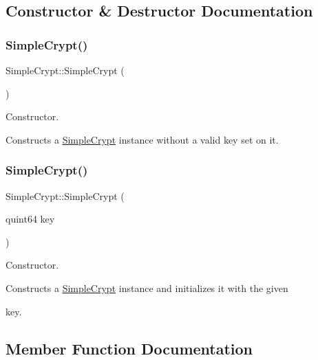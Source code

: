 \subsection{Constructor \& Destructor Documentation}
\mbox{\label{classSimpleCrypt_ac474d12cfa9f93bfecea35891831046d}} 
\subsubsection{\texorpdfstring{Simple\+Crypt()}{SimpleCrypt()}\hspace{0.1cm}{\footnotesize\ttfamily [1/2]}}
{\footnotesize\ttfamily Simple\+Crypt\+::\+Simple\+Crypt (\begin{DoxyParamCaption}{ }\end{DoxyParamCaption})}

Constructor.

Constructs a \hyperlink{classSimpleCrypt}{Simple\+Crypt} instance without a valid key set on it. \mbox{\label{classSimpleCrypt_a65942757b85b3dd36618ea3edc5ceb89}} 
\subsubsection{\texorpdfstring{Simple\+Crypt()}{SimpleCrypt()}\hspace{0.1cm}{\footnotesize\ttfamily [2/2]}}
{\footnotesize\ttfamily Simple\+Crypt\+::\+Simple\+Crypt (\begin{DoxyParamCaption}\item[{quint64}]{key }\end{DoxyParamCaption})\hspace{0.3cm}{\ttfamily [explicit]}}

Constructor.

Constructs a \hyperlink{classSimpleCrypt}{Simple\+Crypt} instance and initializes it with the given \begin{DoxyItemize}
\item key. \end{DoxyItemize}


\subsection{Member Function Documentation}
\mbox{\label{classSimpleCrypt_ac0a68b3ef5441aaf7724f11376e036bd}} 

